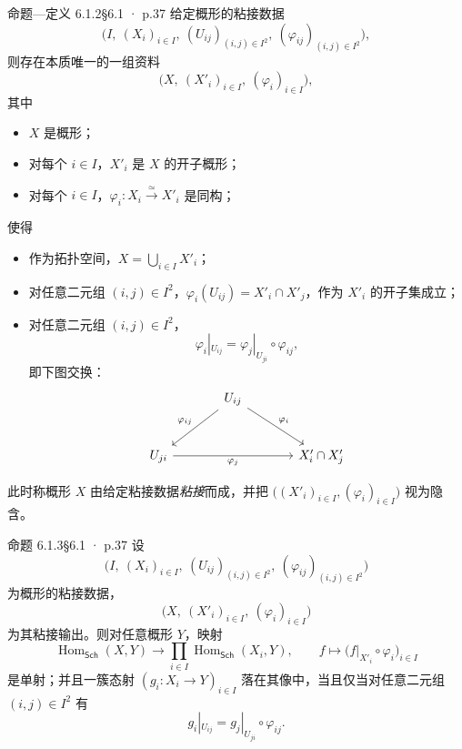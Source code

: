 \documentclass[UTF8,10pt,fontset=windows]{ctexart}
\newcommand{\Hom}{\operatorname{Hom}}\newcommand{\uHom}{\underline{\mathrm{Hom}}}
\newcommand{\Sch}{\mathsf{Sch}}\newcommand{\PShv}{\mathsf{PShv}}
\begin{document}
\begin{card}{命题—定义 6.1.2}{§6.1 · p.37}
给定概形的粘接数据
\[
\bigl(I,\ (X_i)_{i\in I},\ (U_{ij})_{(i,j)\in I^2},\ (\varphi_{ij})_{(i,j)\in I^2}\bigr),
\]
则存在本质唯一的一组资料
\[
\bigl(X,\ (X'_i)_{i\in I},\ (\varphi_i)_{i\in I}\bigr),
\]
其中
\begin{itemize}[leftmargin=1.6em,itemsep=0.2ex]
  \item $X$ 是概形；
  \item 对每个 $i\in I$，$X'_i$ 是 $X$ 的开子概形；
  \item 对每个 $i\in I$，$\varphi_i:X_i\xrightarrow{\ \simeq\ }X'_i$ 是同构；
\end{itemize}
使得
\begin{itemize}[leftmargin=1.6em,itemsep=0.2ex]
  \item 作为拓扑空间，$X=\bigcup_{i\in I}X'_i$；
  \item 对任意二元组 $(i,j)\in I^2$，$\varphi_i(U_{ij})=X'_i\cap X'_j$，作为 $X'_i$ 的开子集成立；
  \item 对任意二元组 $(i,j)\in I^2$，
\[
\varphi_i|_{U_{ij}}=\varphi_j|_{U_{ji}}\circ\varphi_{ij},
\]
即下图交换：
\[
\begin{tikzcd}[column sep=large,row sep=large]
& U_{ij}\arrow[dl,"\varphi_{ij}"']\arrow[dr,"\varphi_i"] & \\
U_{ji}\arrow[rr,"\varphi_j"'] & {} & X'_i\cap X'_j
\end{tikzcd}
\]
\end{itemize}
此时称概形 $X$ 由给定粘接数据\emph{粘接}而成，并把 $\bigl((X'_i)_{i\in I},(\varphi_i)_{i\in I}\bigr)$ 视为隐含。
\end{card}
\begin{card}{命题 6.1.3}{§6.1 · p.37}
设
\[
\bigl(I,\ (X_i)_{i\in I},\ (U_{ij})_{(i,j)\in I^2},\ (\varphi_{ij})_{(i,j)\in I^2}\bigr)
\]
为概形的粘接数据，
\[
\bigl(X,\ (X'_i)_{i\in I},\ (\varphi_i)_{i\in I}\bigr)
\]
为其粘接输出。则对任意概形 $Y$，映射
\[
\Hom_{\Sch}(X,Y)\to\prod_{i\in I}\Hom_{\Sch}(X_i,Y),
\qquad
f\mapsto\bigl(f|_{X'_i}\circ\varphi_i\bigr)_{i\in I}
\]
是单射；并且一簇态射 $(g_i:X_i\to Y)_{i\in I}$ 落在其像中，当且仅当对任意二元组 $(i,j)\in I^2$ 有
\[
g_i|_{U_{ij}}=g_j|_{U_{ji}}\circ\varphi_{ij}.
\]
\end{card}
\end{document}
